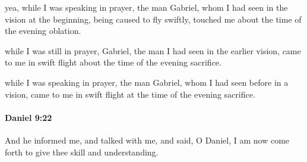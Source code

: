 			\begin{versebox}
					\item[BHS] 
					\item[LXX] 
					\item[ASV] yea, while I was speaking in prayer, the man Gabriel, whom I had seen in the vision at the beginning, being caused to fly swiftly, touched me about the time of the evening oblation.
					\item[NIV] while I was still in prayer, Gabriel, the man I had seen in the earlier vision, came to me in swift flight about the time of the evening sacrifice.
					\item[NRSV] while I was speaking in prayer, the man Gabriel, whom I had seen before in a vision, came to me in swift flight at the time of the evening sacrifice.
			\end{versebox}

		\paragraph{Daniel 9:22} %
			\label{DANIEL-9-22}

			And he informed me, and talked with me, and said, O Daniel, I am now come forth to give thee skill and understanding.

